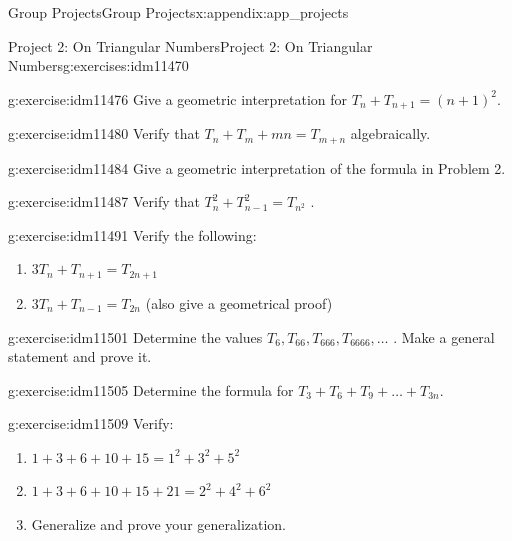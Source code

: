 \documentclass[oneside,10pt,]{book}
\numberwithin{equation}{chapter}
\begin{document}
\begin{appendixptx}{Group Projects}{}{Group Projects}{}{}{x:appendix:app_projects}
\begin{exercises-section-numberless}{Project 2: On Triangular Numbers}{}{Project 2: On Triangular Numbers}{}{}{g:exercises:idm11470}
\begin{divisionexercise}{1}{}{}{g:exercise:idm11476}
Give a geometric interpretation for \(T_{n} + T_{n + 1} = \left( n + 1 \right)^{2}.\)%
\end{divisionexercise}%
\begin{divisionexercise}{2}{}{}{g:exercise:idm11480}%
Verify that \(T_{n} + T_{m} + mn = T_{m + n}\) algebraically.%
\end{divisionexercise}%
\begin{divisionexercise}{3}{}{}{g:exercise:idm11484}%
Give a geometric interpretation of the formula in Problem 2.%
\end{divisionexercise}%
\begin{divisionexercise}{4}{}{}{g:exercise:idm11487}%
Verify that \(T_{n}^{2} + T_{n - 1}^{2} = T_{n^{2}}\) .%
\end{divisionexercise}%
\begin{divisionexercise}{5}{}{}{g:exercise:idm11491}%
Verify the following:%
\begin{enumerate}[label=(\alph*)]
\item{}\(3T_{n} + T_{n + 1} = T_{2n + 1}\)%
\item{}\(3T_{n} + T_{n - 1} = T_{2n}\) (also give a geometrical proof)%
\end{enumerate}
%
\end{divisionexercise}%
\begin{divisionexercise}{6}{}{}{g:exercise:idm11501}%
Determine the values \(T_{6},T_{66},T_{666},T_{6666},\ldots\) . Make a general statement and prove it.%
\end{divisionexercise}%
\begin{divisionexercise}{7}{}{}{g:exercise:idm11505}%
Determine the formula for \(T_{3} + T_{6} + T_{9} + \ldots + T_{3n}.\)%
\end{divisionexercise}%
\begin{divisionexercise}{8}{}{}{g:exercise:idm11509}%
Verify:%
\begin{enumerate}[label=(\alph*)]
\item{}\(1 + 3 + 6 + 10 + 15 = 1^{2} + 3^{2} + 5^{2}\)%
\item{}\(1 + 3 + 6 + 10 + 15 + 21 = 2^{2} + 4^{2} + 6^{2}\)%
\item{}Generalize and prove your generalization.%
\end{enumerate}
%
\end{divisionexercise}%
\end{exercises-section-numberless}
%
%
\typeout{************************************************}
\typeout{************************************************}

\end{appendixptx}
\end{document}
